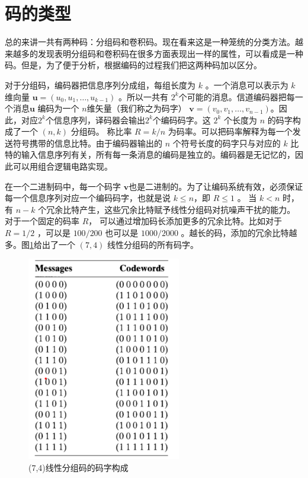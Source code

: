 \documentclass[10pt,a4paper,UTF8]{article}
\begin{document}
\section{码的类型}
\label{sec:orgheadline2}


总的来讲一共有两种码：分组码和卷积码。现在看来这是一种笼统的分类方法。越来越多的发现表明分组码和卷积码在很多方面表现出一样的属性，可以看成是一种码。但是，为了便于分析，根据编码的过程我们把这两种码加以区分。

对于分组码，编码器把信息序列分成组，每组长度为 \(k\) 。一个消息可以表示为 \(k\)  维向量 \(\mathbf{u} = (u_{0},u_{1},\ldots,u_{k-1})\) 。所以一共有 \(2^{k}\)个可能的消息。信道编码器把每一个消息\(\mathbf{u}\) 编码为一个 \(n\)维矢量（我们称之为码字） \(\mathbf{v} = (v_{0},v_{1},\ldots, v_{n-1})\)。因此，对应\(2^{k}\)个信息序列，译码器会输出\(2^{k}\)个编码码字。这 \(2^{k}\) 个长度为 \(n\) 的码字构成了一个 \((n,k)\) 分组码。 称比率 \(R = k/n\) 为码率。可以把码率解释为每一个发送符号携带的信息比特。由于编码器输出的 \(n\) 个符号长度的码字只与对应的 \(k\) 比特的输入信息序列有关，所有每一条消息的编码是独立的。编码器是无记忆的，因此可以用组合逻辑电路实现。

在一个二进制码中，每一个码字 \(\mathbf{v}\)也是二进制的。为了让编码系统有效，必须保证每一个信息序列对应一个编码码字，也就是说 \(k \leq n\)，即 \(R \leq 1\)  。 当 \(k < n\) 时，有 \(n-k\) 个冗余比特产生，这些冗余比特赋予线性分组码对抗噪声干扰的能力。对于一个固定的码率 \(R\)， 可以通过增加码长添加更多的冗余比特。比如对于 \(R=1/2\) ，可以是 \(100/200\) 也可以是 \(1000/2000\) 。越长的码，添加的冗余比特越多。图\ref{fig:orgparagraph3}给出了一个 \((7,4)\) 线性分组码的所有码字。
\begin{figure}[htb]
\centering
\includegraphics[width=0.6\textwidth]{../../img/20161112tab01_01.png}
\caption{\label{fig:orgparagraph3}
(7,4)线性分组码的码字构成}
\end{figure}
\end{document}
